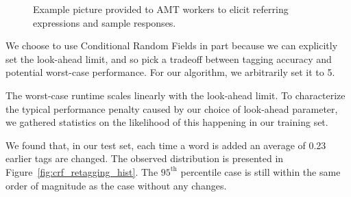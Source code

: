 \documentclass[conference]{IEEEtran}
\numberwithin{equation}{section}
\begin{document}
\begin{figure}[!t]
  \centering
  \setlength\extrarowheight{0pt}
	\caption{Example picture provided to AMT workers to elicit referring expressions and sample responses.}
	\label{fig:ref_expr_examples_pic}
\end{figure}

We choose to use Conditional Random Fields in part because we can explicitly set the look-ahead limit, and so pick a tradeoff between tagging accuracy and potential worst-case performance. For our algorithm, we arbitrarily set it to 5.

The worst-case runtime scales linearly with the look-ahead limit. To characterize the typical performance penalty caused by our choice of look-ahead parameter, we gathered statistics on the likelihood of this happening in our training set.

We found that, in our test set, each time a word is added an average of 0.23 earlier tags are changed. The observed distribution is presented in Figure~\ref{fig:crf_retagging_hist}. The $95^\text{th}$ percentile case is still within the same order of magnitude as the case without any changes.
\end{document}
